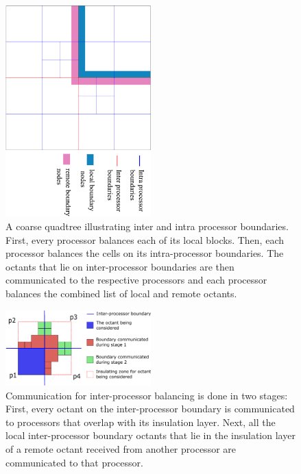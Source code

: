 \begin{figure}
  \begin{center}  
    \includegraphics[angle=90, width=0.5\textwidth]{images/parBal}
  \end{center}
  \caption{A coarse quadtree illustrating inter and intra processor
  boundaries. First, every processor balances each of its local
  blocks. Then, each processor balances the cells on its
  intra-processor boundaries. The octants that lie on inter-processor
  boundaries are then communicated to the respective processors and
  each processor balances the combined list of local and remote
  octants.}
  \label{fig:parBal}
\end{figure}

\begin{figure}
  \begin{center}  
    \includegraphics[width=0.5\textwidth]{images/commTwoStage}    
  \end{center}
  \caption{Communication for inter-processor balancing is done in two stages: First, every octant on the inter-processor boundary is communicated to processors that overlap with its insulation layer. Next, all the local inter-processor boundary octants that lie in the insulation layer of a remote octant received from another processor are communicated to that processor.}  
  \label{fig:commTwoStage}
\end{figure}

